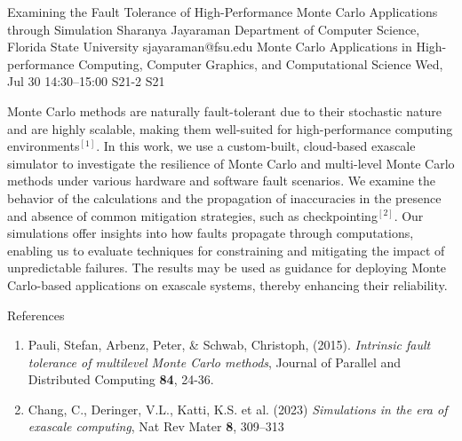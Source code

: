 \documentclass[12pt,lettersize,oneside]{book} %
\begin{document}
\begin{talk}
  {Examining the Fault Tolerance of High-Performance Monte Carlo Applications through Simulation}%
  {Sharanya Jayaraman}%
  {Department of Computer Science, Florida State University}%
  {sjayaraman@fsu.edu}%
  {Monte Carlo Applications in High-performance Computing, Computer Graphics, and Computational Science}%
  {}%
  {Wed, Jul 30 14:30--15:00}%
  {S21-2}%
  {S21}%
   
Monte Carlo methods are naturally fault-tolerant due to their stochastic nature and are highly scalable, making them well-suited for high-performance computing environments$^{[1]}$. In this work, we use a custom-built, cloud-based exascale simulator to investigate the resilience of Monte Carlo and multi-level Monte Carlo methods under various hardware and software fault scenarios. We examine the behavior of the calculations and the propagation of inaccuracies in the presence and absence of common mitigation strategies, such as checkpointing$^{[2]}$. Our simulations offer insights into how faults propagate through computations, enabling us to evaluate techniques for constraining and mitigating the impact of unpredictable failures. The results may be used as guidance for deploying Monte Carlo-based applications on exascale systems, thereby enhancing their reliability.

\medskip

References
\begin{enumerate}
 \item[{[1]}] Pauli, Stefan, Arbenz, Peter, \&  Schwab, Christoph, (2015). {\it Intrinsic fault tolerance of multilevel Monte Carlo methods}, Journal of Parallel and Distributed Computing \textbf{84}, 24-36.
 \item[{[2]}] Chang, C., Deringer, V.L., Katti, K.S. et al. (2023) {\it Simulations in the era of exascale computing}, Nat Rev Mater \textbf{8}, 309--313 
\end{enumerate}

\end{talk}
\end{document}

